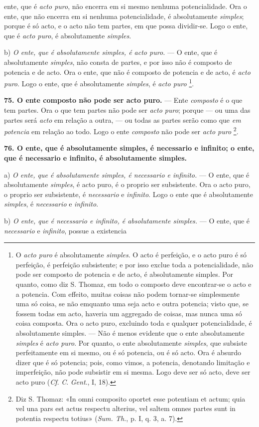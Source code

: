  ente, que é \emph{acto puro}, não encerra em si mesmo nenhuma potencialidade. Ora o ente, que não encerra em si nenhuma potencialidade, é absolutamente \emph{simples}; porque é só acto, e o acto não tem partes, em que possa dividir-se. Logo o ente, que é \emph{acto puro}, é absolutamente \emph{simples}.

b) \emph{O ente, que é absolutamente simples, é acto puro.} --- O ente, que é absolutamente \emph{simples}, não consta de partes, e por isso não é composto de potencia e de acto. Ora o ente, que não é composto de potencia e de acto, é \emph{acto puro}. Logo o ente, que é absolutamente \emph{simples}, é \emph{acto puro} \footnote{O \emph{acto puro} é absolutamente \emph{simples}. O acto é perfeição, e o acto puro é só perfeição, é perfeição subsistente; e por isso exclue toda a potencialidade, não pode ser composto de potencia e de acto, é absolutamente simples. Por quanto, como diz S. Thomaz, em todo o composto deve encontrar-se o acto e a potencia. Com effeito, muitas coisas não podem tornar-se simplesmente uma só coisa, se não emquanto uma seja acto e outra potencia; visto que, se fossem todas em acto, haveria um aggregado de coisas, mas nunca uma só coisa composta. Ora o acto puro, excluindo toda e qualquer potencialidade, é absolutamente simples. --- Não é menos evidente que o ente absolutamente \emph{simples} é \emph{acto puro}. Por quanto, o ente absolutamente \emph{simples}, que subsiste perfeitamente em si mesmo, ou é só potencia, ou é só acto. Ora é absurdo dizer que é só potencia; pois, como vimos, a potencia, denotando limitação e imperfeição, não pode subsistir em si mesma. Logo deve ser só acto, deve ser acto puro (\emph{Cf}. \emph{C}. \emph{Gent}., I, 18).}.

\textbf{75. O ente composto não pode ser acto puro.} --- Ente \emph{composto} é o que tem partes. Ora o que tem partes não pode ser \emph{acto puro}; porque --- ou uma das partes será \emph{acto} em relação a outra, --- ou todas as partes serão como que \emph{em potencia} em relação ao todo. Logo o ente \emph{composto} não pode ser \emph{acto puro} \footnote{Diz S. Thomaz: «In omni composito oportet esse potentiam et actum; quia vel una pars est actus respectu alterius, vel saltem omnes partes sunt in potentia respectu totius» (\emph{Sum. Th.}, p. I, q. 3, a. 7).}.

\textbf{76. O ente, que é absolutamente simples, é necessario e infinito; o ente, que é necessario e infinito, é absolutamente simples.}

a) \emph{O ente, que é absolutamente simples, é necessario e infinito.} --- O ente, que é absolutamente \emph{simples}, é acto puro, é o proprio ser subsistente. Ora o acto puro, o proprio ser subsistente, é \emph{necessario} e \emph{infinito}. Logo o ente que é absolutamente \emph{simples}, é \emph{necessario} e \emph{infinito}.

b) \emph{O ente, que é necessario e infinito, é absolutamente simples.} --- O ente, que é \emph{necessario} e \emph{infinito}, possue a existencia
